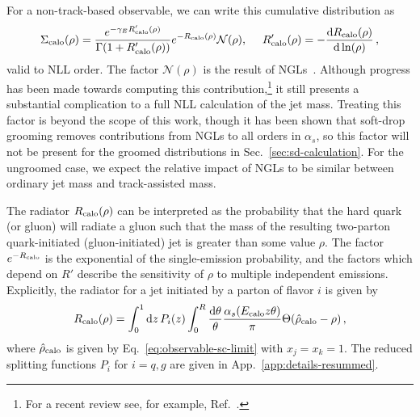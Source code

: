 \documentclass[letterpaper,11pt]{article}
\newcommand{\Ref}[1]{Ref.~\cite{#1}}
\newcommand{\Sec}[1]{Sec.~\ref{#1}}
\newcommand{\App}[1]{App.~\ref{#1}}
\newcommand{\Eq}[1]{Eq.~\eqref{#1}}
\begin{document}
For a non-track-based observable, we can write this cumulative distribution as~\cite{Catani:1991bd,Catani:1992ua,Banfi:2004yd}
\begin{equation}
\label{eq:cal-cumulative}
\Sigma_{\rm calo}(\rho) = \frac{e^{-\gamma_E R_{\rm calo}'(\rho)}}{\Gamma(1+R_{\rm calo}'(\rho))} e^{-R_{\rm calo}(\rho)}\mathcal{N}(\rho), \ \ \ \ R_{\rm calo}'(\rho) = - \frac{\text{d}R_{\rm calo}(\rho)}{\text{d}\ln(\rho)}\,,
\end{equation}
valid to NLL order.
%
The factor $\mathcal{N}(\rho)$ is the result of NGLs~\cite{Dasgupta:2001sh}.
%
Although progress has been made towards computing this contribution,\footnote{For a recent review see, for example, \Ref{Larkoski:2017jix}. } it still presents a substantial complication to a full NLL calculation of the jet mass. 
%
Treating this factor is beyond the scope of this work, though it has been shown \cite{Larkoski:2014wba,Frye:2016aiz} that soft-drop grooming removes contributions from NGLs to all orders in $\alpha_s$, so this factor will not be present for the groomed distributions in \Sec{sec:sd-calculation}.
%
For the ungroomed case, we expect the relative impact of NGLs to be similar between ordinary jet mass and track-assisted mass.
 

The radiator $R_{\rm calo}(\rho)$ can be interpreted as the probability that the hard quark (or gluon) will radiate a gluon such that the mass of the resulting two-parton quark-initiated (gluon-initiated) jet is greater than some value $\rho$.
%
The factor $e^{-R_{\rm calo}}$ is the exponential of the single-emission probability, and the factors which depend on $R'$ describe the sensitivity of $\rho$ to multiple independent emissions. 
%
Explicitly, the radiator for a jet initiated by a parton of flavor $i$ is given by
\begin{equation}
\label{eq:radiator-calorimeter}
R_{\rm calo}(\rho) = \int_0^1 \text{d}z\, P_{i}(z) \int_0^{R}\frac{\text{d}\theta}{\theta}\frac{\alpha_s(E_{\rm calo}z\theta)}{\pi} \Theta(\hat{\rho}_{\rm calo}-\rho)\,,
\end{equation}
where $\hat{\rho}_{\rm calo}$ is given by \Eq{eq:observable-sc-limit} with $x_j = x_k = 1$.
%
The reduced splitting functions $P_i$ for $i=q,g$ are given in \App{app:details-resummed}. 
\end{document}
